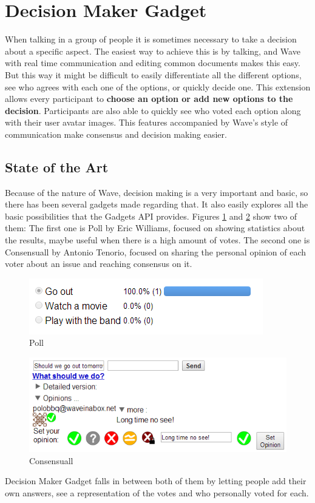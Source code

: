 \thispagestyle{sectioned}
\section{Decision Maker Gadget}
When talking in a group of people it is sometimes necessary to take a decision about a specific aspect. The easiest way to achieve this is by talking, and Wave with real time communication and editing common documents makes this easy. But this way it might be difficult to easily differentiate all the different options, see who agrees with each one of the options, or quickly decide one. This extension allows every participant to \textbf{choose an option or add new options to the decision}. Participants are also able to quickly see who voted each option along with their user avatar images. This features accompanied by Wave's style of communication make consensus and decision making easier.

\label{subsec:decision_soa}
\subsection{State of the Art}
Because of the nature of Wave, decision making is a very important and basic, so there has been several gadgets made regarding that. It also easily explores all the basic possibilities that the Gadgets API provides. Figures \ref{fig:poll} and \ref{fig:consensuall} show two of them: The first one is Poll by Eric Williams, focused on showing statistics about the results, maybe useful when there is a high amount of votes. The second one is Consensuall by Antonio Tenorio, focused on sharing the personal opinion of each voter about an issue and reaching consensus on it.\\[.2cm]
\begin{figure}[H]
  \center
    \includegraphics[keepaspectratio, scale=0.7]{Media/Captures/Extensions/DecisionGadgets/other.png}
  \caption{Poll}
  \label{fig:poll}
\end{figure}
\begin{figure}[h]
  \center    
    \includegraphics[keepaspectratio, scale=0.7]{Media/Captures/Extensions/DecisionGadgets/consensuall.png}
  \caption{Consensuall}
  \label{fig:consensuall}
\end{figure}
Decision Maker Gadget falls in between both of them by letting people add their own answers, see a representation of the votes and who personally voted for each.

